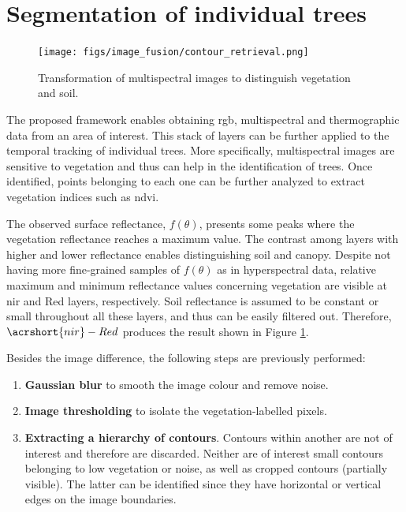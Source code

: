 \section{Segmentation of individual trees}

\begin{figure}
	\centering
	\texttt{[image: figs/image\_fusion/contour\_retrieval.png]}
	\caption{Transformation of multispectral images to distinguish vegetation and soil.}
	\label{fig:contour_extraction}
\end{figure}

The proposed framework enables obtaining \acrshort{rgb}, multispectral and thermographic data from an area of interest. This stack of layers can be further applied to the temporal tracking of individual trees. More specifically, multispectral images are sensitive to vegetation and thus can help in the identification of trees. Once identified, points belonging to each one can be further analyzed to extract vegetation indices such as \acrshort{ndvi}. 

The observed surface reflectance, $f(\theta)$, presents some peaks where the vegetation reflectance reaches a maximum value. The contrast among layers with higher and lower reflectance enables distinguishing soil and canopy. Despite not having more fine-grained samples of $f(\theta)$ as in hyperspectral data, relative maximum and minimum reflectance values concerning vegetation are visible at \acrshort{nir} and Red layers, respectively. Soil reflectance is assumed to be constant or small throughout all these layers, and thus can be easily filtered out. Therefore, $\acrshort{nir} - Red$ produces the result shown in Figure \ref{fig:contour_extraction}.

Besides the image difference, the following steps are previously performed:
\begin{enumerate}
    \item \textbf{Gaussian blur} to smooth the image colour and remove noise.
    \item \textbf{Image thresholding} to isolate the vegetation-labelled pixels.
    \item \textbf{Extracting a hierarchy of contours}. Contours within another are not of interest and therefore are discarded. Neither are of interest small contours belonging to low vegetation or noise, as well as cropped contours (partially visible). The latter can be identified since they have horizontal or vertical edges on the image boundaries.
\end{enumerate}

